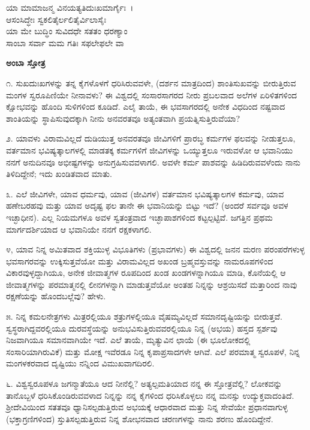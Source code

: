 
\begin{myquote}
ಯಾ ಮಾಮಾಜನ್ಮ ವಿನಯತ್ಯತಿದುಃಖಮಾರ್ಗೈಃ~।\\
ಆಸಂಸಿದ್ಧೇಃ ಸ್ವಕಲಿತೈರ್ಲಲಿತೈರ್ವಿಲಾಸೈಃ\\ಯಾ ಮೇ ಬುದ್ಧಿಂ ಸುವಿದಧೇ ಸತತಂ ಧರಣ್ಯಾಂ\\ಸಾಂಬಾ ಸರ್ವಾ ಮಮ ಗತಿಃ ಸಫಲೇಫಲೇ ವಾ
\end{myquote}


\begin{center}
\textbf{ಅಂಬಾ ಸ್ತೋತ್ರ}
\end{center}

೧. ಸುಖದುಃಖಗಳನ್ನು ತನ್ನ ಕೈಗಳೊಳಗೆ ಧರಿಸಿರುವವಳೇ, (ದರ್ಶನ ಮಾತ್ರದಿಂದ) ಶಾಂತಿಸುಖವನ್ನು ಬೀರುತ್ತಿರುವ ಮಂಗಳ ಸ್ವರೂಪಿಣಿಯೇ ನೀನಾವಳು? ಈ ವಿಶ್ವದಲ್ಲಿ ಸಂಸಾರಸಾಗರದ ನೀರು ಪ್ರಬಲವಾದ ಅಲೆಗಳ ಏರಿಳಿತಗಳಿಂದ ಕ್ಷೋಭವನ್ನು ಹೊಂದಿ ಸುಳಿಗಳಿಂದ ಕೂಡಿದೆ. ಎಲೈ ತಾಯೆ, ಈ ಭವಸಾಗರದಲ್ಲಿ ಅನೇಕ ವಿಧದಿಂದ ನಷ್ಟವಾದ ಶಾಂತಿಯನ್ನು ಸ್ಥಾಪಿಸುವುದಕ್ಕಾಗಿ ನೀನು ಅನವರತವೂ ಅತ್ಯಂತವಾಗಿ ಪ್ರಯತ್ನಿಸುತ್ತಿರುವೆಯಾ?

೨. ಯಾವಳು ವಿರಾಮವಿಲ್ಲದೆ ದುಡಿಯುತ್ತ ಅನವರತವೂ ಜೀವಿಗಳಿಗೆ ಪ್ರಾರಬ್ಧ ಕರ್ಮಗಳ ಫಲವನ್ನು ನೀಡುತ್ತಲೂ, ವರ್ತಮಾನ ಭವಿಷ್ಯತ್ಕಾಲಗಳಲ್ಲಿ ಮಾಡತಕ್ಕ ಕರ್ಮಗಳಿಗೆ ಜೀವಿಗಳನ್ನು ಒಯ್ಯುತ್ತಲೂ ಇರುವಳೋ ಆ ಭವಾನಿಯು ನನಗೆ ಅನುದಿನವೂ ಅಭೀಷ್ಟಗಳನ್ನು ಅನುಗ್ರಹಿಸುವವಳಾಗಲಿ. ಅವಳೇ ಕರ್ಮ ಪಾಶವನ್ನು ಹಿಡಿದಿರುವವಳೆಂದು ನಾನು ತಿಳಿದಿದ್ದೇನೆ; ಇದು ಖಂಡಿತವಾದ ಮಾತು.

೩. ಎಲೆ ಜೀವಿಗಳೇ, ಯಾವ ಧರ್ಮವು, ಯಾವ (ಜೀವಿಗಳ) ವರ್ತಮಾನ ಭವಿಷ್ಯತ್ಕಾಲಗಳ ಕರ್ಮವು, ಯಾವ ಹಣೇಬರಹವು ಮತ್ತು ಯಾವ ಅದೃಷ್ಟ ಫಲ ತಾನೇ ಈ ಭವಾನಿಯನ್ನು ಬಿಟ್ಟು ಇದೆ? (ಅಂದರೆ ಸರ್ವವೂ ಅವಳ ಇಚ್ಛಾಧೀನ). ಎಲ್ಲ ನಿಯಮಗಳೂ ಅವಳ ಸ್ವತಂತ್ರವಾದ ಇಚ್ಛಾಪಾಶಗಳಿಂದ ಕಟ್ಟಲ್ಪಟ್ಟಿವೆ. ಜಗತ್ತಿನ ಪ್ರಥಮ ಮಾರ್ಗದರ್ಶಿಯಾದ ಆ ಭವಾನಿಯೇ ನನಗೆ ರಕ್ಷಕಳಾಗಲಿ.

೪, ಯಾವ ನಿನ್ನ ಅಮಿತವಾದ ಶಕ್ತಿಯುಳ್ಳ ವಿಭೂತಿಗಳು (ಪ್ರಭಾವಗಳು) ಈ ವಿಶ್ವದಲ್ಲಿ ಜನನ ಮರಣ ಪರಂಪರೆಗಳುಳ್ಳ ಭವಸಾಗರವನ್ನು ಉಕ್ಕಿಸುತ್ತವೆಯೋ ಮತ್ತು ವಿರಾಮವಿಲ್ಲದ ಅಖಂಡ ಬ್ರಹ್ಮವಸ್ತುವನ್ನು ನಾಮರೂಪಗಳಿಂದ ವಿಕಾರವುಳ್ಳದ್ದಾಗಿಯೂ, ಅನೇಕ ಜೀವಾತ್ಮಗಳ ರೂಪದಿಂದ ಖಂಡ ಖಂಡಗಳನ್ನಾಗಿಯೂ ಮಾಡಿ, ಕೊನೆಯಲ್ಲಿ ಆ ಜೀವಾತ್ಮಗಳನ್ನು ಪರಮಾತ್ಮನಲ್ಲಿ ಲೀನಗಳನ್ನಾಗಿ ಮಾಡುತ್ತವೆಯೋ ಅಂತಹ ನಿನ್ನನ್ನು ಆಶ್ರಯಿಸದೆ ಮತ್ತಾರಿಂದ ನಾವು ರಕ್ಷಣೆಯನ್ನು ಹೊಂದಬಲ್ಲೆವು? ಹೇಳು.

೫. ನಿನ್ನ ಕಮಲನೇತ್ರಗಳು ಮಿತ್ರರಲ್ಲಿಯೂ ಶತ್ರುಗಳಲ್ಲಿಯೂ ವೈಷಮ್ಯವಿಲ್ಲದೆ ಸಮಾನದೃಷ್ಟಿಯನ್ನು ಬೀರುತ್ತವೆ. ಸ್ವಸ್ಥರಾಗಿದ್ದವರಲ್ಲಿಯೂ ದುರವಸ್ಥೆಯನ್ನು ಅನುಭವಿಸುತ್ತಿರುವವರಲ್ಲಿಯೂ ನಿನ್ನ (ಅಭಯ) ಹಸ್ತದ ಸ್ಪರ್ಶವು ನಿಜವಾಗಿಯೂ ಸಮಾನವಾಗಿಯೇ ಇದೆ. ಎಲೆ ತಾಯೆ, ಮೃತ್ಯುವಿನ ಛಾಯೆ (ಈ ಭೂಲೋಕದಲ್ಲಿ ಸಂಸಾರಿಯಾಗಿರುವಿಕೆ) ಮತ್ತು ಮೋಕ್ಷ ಇವೆರಡೂ ನಿನ್ನ ಕೃಪಾಪ್ರಸಾದಗಳೇ ಆಗಿವೆ. ಎಲೆ ಪರಮಾತ್ಮ ಸ್ವರೂಪಳೆ, ನಿನ್ನ ಮಂಗಳಕರವಾದ ದೃಷ್ಟಿಯು ನನ್ನಿಂದ ವಿಮುಖವಾಗದಿರಲಿ.

೬. ವಿಶ್ವಸ್ವರೂಪಳೂ ಜಗನ್ಮಾತೆಯೂ ಆದ ನೀನೆಲ್ಲಿ? ಅತ್ಯಲ್ಪಮತಿಯಾದ ನನ್ನ ಈ ಸ್ತೋತ್ರವೆಲ್ಲಿ? ಲೋಕವನ್ನು ತಾನೊಬ್ಬಳೆ ಧರಿಸಿಕೊಂಡಿರುವವಳಾದ ನಿನ್ನನ್ನು ನನ್ನ ಕೈಗಳಿಂದ ಧರಿಸಿಕೊಳ್ಳಲು ನನ್ನ ಮನಸ್ಸು ಉದ್ಯುಕ್ತವಾದಂತಿದೆ. ಶ‍್ರೀದೇವಿಯಿಂದ ಸತತವೂ ಧ್ಯಾನಿಸಲ್ಪಡುತ್ತಿರುವ ಅಭಯಕ್ಕೆ ಆಧಾರವಾದ ಮತ್ತು ನಿನ್ನ ಸೇವೆಯೇ ಪ್ರಧಾನವಾಗುಳ್ಳ (ಭಕ್ತಾಗ್ರಣಿಗಳಿಂದ) ಸ್ತುತಿಸಲ್ಪಡುತ್ತಿರುವ ನಿನ್ನ ಶೋಭನವಾದ ಚರಣಗಳನ್ನು ನಾನು ಶರಣು ಹೊಂದಿದ್ದೇನೆ.

